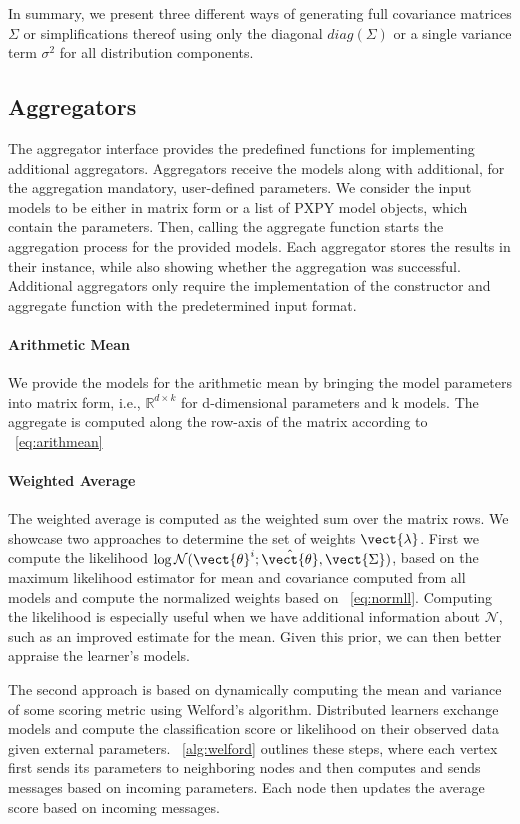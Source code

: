 In summary, we present three different ways of generating full covariance matrices $\Sigma$ or simplifications thereof using only the diagonal $diag(\Sigma)$ or a single variance term $\sigma^2$ for all distribution components.
\subsection{Aggregators}

The aggregator interface provides the predefined functions for implementing additional aggregators.
Aggregators receive the models along with additional, for the aggregation mandatory, user-defined parameters.
We consider the input models to be either in matrix form or a list of PXPY model objects, which contain the parameters.
Then, calling the aggregate function starts the aggregation process for the provided models. 
Each aggregator stores the results in their instance, while also showing whether the aggregation was successful.
Additional aggregators only require the implementation of the constructor and aggregate function with the predetermined input format.

\paragraph*{Arithmetic Mean}
We provide the models for the arithmetic mean by bringing the model parameters into matrix form, i.e., $\mathbb{R}^{d \times k}$ for d-dimensional parameters and k models.
The aggregate is computed along the row-axis of the matrix according to \eq~\ref{eq:arithmean}

\paragraph*{Weighted Average}
The weighted average is computed as the weighted sum over the matrix rows.
We showcase two approaches to determine the set of weights $\vect{\lambda}$.
First we compute the likelihood $\log \mathcal{N}(\vect{\theta}^i; \hat{\vect{\theta}}, \vect{\Sigma})$, based on the maximum likelihood estimator for mean and covariance computed from all models and compute the normalized weights based on \eq~\ref{eq:normll}.
Computing the likelihood is especially useful when we have additional information about $\mathcal{N}$, such as an improved estimate for the mean. 
Given this prior, we can then better appraise the learner's models.

The second approach is based on dynamically computing the mean and variance of some scoring metric using Welford's algorithm.
Distributed learners exchange models and compute the classification score or likelihood on their observed data given external parameters.
\alg~\ref{alg:welford} outlines these steps, where each vertex first sends its parameters to neighboring nodes and then computes and sends messages based on incoming parameters. 
Each node then updates the average score based on incoming messages.

